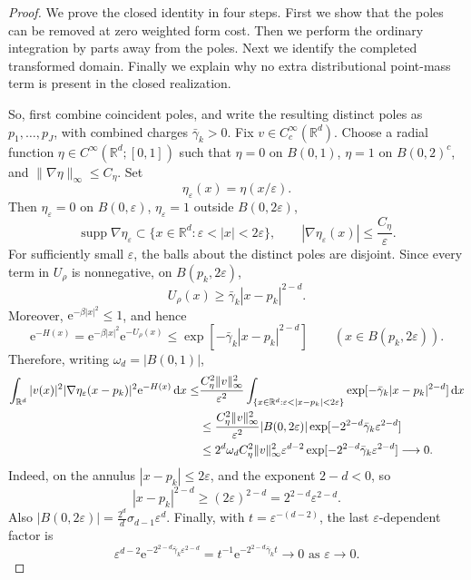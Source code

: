 \documentclass[12pt,reqno,letterpaper]{amsart}
\theoremstyle{definition}
\theoremstyle{remark}
\numberwithin{equation}{section}
\newcommand{\R}{\mathbb R}
\newcommand{\dd}{\,\mathrm d}
\newcommand{\ee}{\mathrm e}
\newcommand{\be}{\beta}
\begin{document}
\begin{proof}
We prove the closed identity in four steps.  First we show that the poles can
be removed at zero weighted form cost.  Then we perform the ordinary
integration by parts away from the poles.  Next we identify the completed
transformed domain.  Finally we explain why no extra distributional
point-mass term is present in the closed realization.


So, first combine coincident poles, and write the resulting distinct poles as
\(p_1,\ldots,p_J\), with combined charges \(\bar\gamma_k>0\).  Fix
\(v\in C_c^\infty(\R^d)\).  Choose a radial function
\(\eta\in C^\infty(\R^d;[0,1])\) such that \(\eta=0\) on \(B(0,1)\),
\(\eta=1\) on \(B(0,2)^c\), and \(\|\nabla\eta\|_\infty\le C_\eta\).
Set
\[
 \eta_\varepsilon(x)=\eta(x/\varepsilon).
\]
Then \(\eta_\varepsilon=0\) on \(B(0,\varepsilon)\),
\(\eta_\varepsilon=1\) outside \(B(0,2\varepsilon)\),
\[
 \operatorname{supp}\nabla\eta_\varepsilon
 \subset\{x\in\R^d:\varepsilon<|x|<2\varepsilon\},
 \qquad
 |\nabla\eta_\varepsilon(x)|\le\frac{C_\eta}{\varepsilon}.
\]
For sufficiently small \(\varepsilon\), the balls about the distinct poles
are disjoint.  Since every term in \(U_\rho\) is nonnegative, on
\(B(p_k,2\varepsilon)\),
\begin{equation*}
 U_{\rho}(x)\ge \bar\gamma_k|x-p_k|^{2-d}.
\end{equation*}
Moreover, \(\ee^{-\be|x|^2}\le1\), and hence
\[
 \ee^{-H(x)}
 =\ee^{-\be|x|^2}\ee^{-U_\rho(x)}
 \le\exp[-\bar\gamma_k|x-p_k|^{2-d}]
 \qquad(x\in B(p_k,2\varepsilon)).
\]
Therefore, writing \(\omega_d=|B(0,1)|\),
\begin{align}
 \int_{\R^d} |v(x)|^2
  |\nabla\eta_\varepsilon(x-p_k)|^2\ee^{-H(x)}\dd x
 \le
 &\frac{C_\eta^2\|v\|_\infty^2}{\varepsilon^2}
 \int_{\{x\in\R^d:\varepsilon<|x-p_k|<2\varepsilon\}}
 \exp[-\bar\gamma_k|x-p_k|^{2-d}]\dd x
 \notag\\
 &\le
 \frac{C_\eta^2\|v\|_\infty^2}{\varepsilon^2}
 |B(0,2\varepsilon)|
 \exp[-2^{2-d}\bar\gamma_k\varepsilon^{2-d}]
 \notag\\
 &\le
 2^d\omega_d C_\eta^2\|v\|_\infty^2\varepsilon^{d-2}
 \exp[-2^{2-d}\bar\gamma_k\varepsilon^{2-d}]
 \longrightarrow0.
 \label{eq:pole-cutoff-cost}
\end{align}
Indeed, on the annulus \(|x-p_k|\le2\varepsilon\), and the exponent
\(2-d<0\), so
\[
 |x-p_k|^{2-d}\ge(2\varepsilon)^{2-d}
 =2^{2-d}\varepsilon^{2-d}.
\]
Also \(|B(0,2\varepsilon)|=\frac{2^d}{d}\sigma_{d-1}\varepsilon^d\).  Finally, with
\(t=\varepsilon^{-(d-2)}\), the last \(\varepsilon\)-dependent factor is
\[
 \varepsilon^{d-2}
 \ee^{-2^{2-d}\bar\gamma_k\varepsilon^{2-d}}
 =t^{-1}\ee^{-2^{2-d}\bar\gamma_k t}\longrightarrow0 \text{ as }\varepsilon \to 0.
\]


\end{proof}
\end{document}
